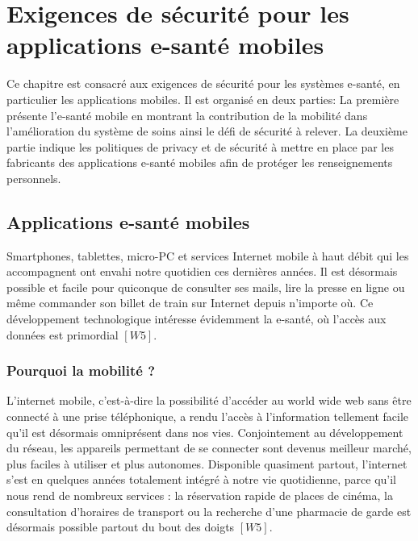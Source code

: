 \chapter{Exigences de sécurité pour les applications e-santé mobiles}

Ce chapitre est consacré aux exigences de sécurité pour les systèmes e-santé, en particulier les applications mobiles. Il est organisé en deux parties: La première présente l'e-santé mobile en montrant la contribution de la mobilité dans l'amélioration du système de soins ainsi le défi de sécurité à relever. La deuxième partie indique les politiques de privacy et de sécurité à mettre en place par les fabricants des applications e-santé mobiles afin de protéger les renseignements personnels.

\section{Applications e-santé mobiles}

Smartphones, tablettes, micro-PC et services Internet mobile à haut débit qui les accompagnent ont envahi notre quotidien ces dernières années. Il est désormais possible et facile pour quiconque de consulter ses mails, lire la presse en ligne ou même commander son billet de train sur Internet depuis n’importe où. Ce développement technologique intéresse évidemment la e-santé, où l’accès aux données est primordial $[W5]$.

\vspace{6pt}
\paragraphmark

\subsection{Pourquoi la mobilité ?}

L’internet mobile, c’est-à-dire la possibilité d’accéder au world wide web sans être connecté à une prise téléphonique, a rendu l’accès à l’information tellement facile qu’il est désormais omniprésent dans nos vies. Conjointement au développement du réseau, les appareils permettant de se connecter sont devenus meilleur marché, plus faciles à utiliser et plus autonomes. Disponible quasiment partout, l’internet s’est en quelques années totalement intégré à notre vie quotidienne, parce qu’il nous rend de nombreux services : la réservation rapide de places de cinéma, la consultation d’horaires de transport ou la recherche d’une pharmacie de garde est désormais possible partout du bout des doigts $[W5]$.

